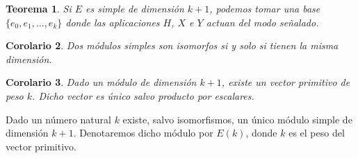 \documentclass[a4paper,draft,12pt]{scrartcl}
\newtheorem{teo}{Teorema}[section]%
\newtheorem{cor}[teo]{Corolario}%
\begin{document}
\begin{teo}

Si $E$ es simple de dimensión $k+1$, podemos tomar una base $\{e_0,e_1,\dots, e_k\}$ donde las aplicaciones $H$, $X$ e $Y$ actuan del modo señalado.

\end{teo}

\begin{cor}

Dos módulos simples son isomorfos si y solo si tienen la misma dimensión.

\end{cor}

\begin{cor}

Dado un módulo de dimensión $k+1$, existe un vector primitivo de peso $k$.  Dicho vector es único salvo producto por escalares.

\end{cor}

Dado un número natural $k$ existe, salvo isomorfismos, un único módulo simple de dimensión $k+1$.  Denotaremos dicho módulo por $E(k)$, donde $k$ es el peso del vector primitivo.

\bigskip

\end{document}

